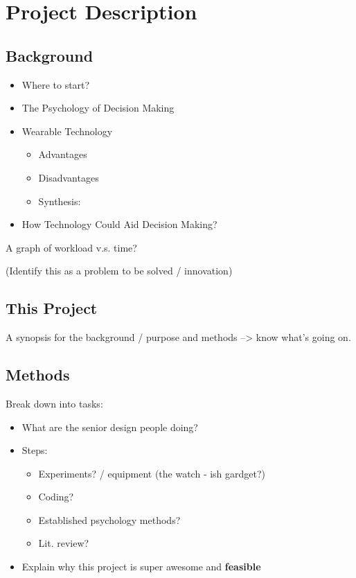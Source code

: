 \documentclass[12pt]{article}
\begin{document}






\section{Project Description}\label{project-description}

\subsection{Background}\label{background}

\begin{itemize}
\itemsep1pt\parskip0pt
\item
  Where to start?
\item
  The Psychology of Decision Making
\item
  Wearable Technology

  \begin{itemize}
  \itemsep1pt\parskip0pt
  \item
    Advantages
  \item
    Disadvantages
  \item
    Synthesis:
  \end{itemize}
\item
  How Technology Could Aid Decision Making?
\end{itemize}

A graph of workload v.s. time?

(Identify this as a problem to be solved / innovation)

\subsection{This Project}\label{this-project}

A synopsis for the background / purpose and methods --\textgreater{}
know what's going on.

\subsection{Methods}\label{methods}

Break down into tasks:

\begin{itemize}
\itemsep1pt\parskip0pt
\item
  What are the senior design people doing?
\item
  Steps:

  \begin{itemize}
  \itemsep1pt\parskip0pt
  \item
    Experiments? / equipment (the watch - ish gardget?)
  \item
    Coding?
  \item
    Established psychology methods?
  \item
    Lit. review?
  \end{itemize}
\item
  Explain why this project is super awesome and \textbf{feasible}
\end{itemize}
\end{document}
